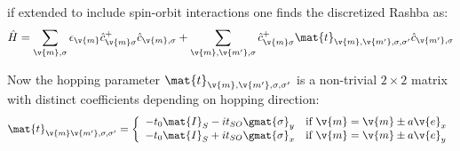 if extended to include spin-orbit interactions one finds the discretized Rashba \hamil as:
\begin{align}
	\hat{H} = \sum_{\v{m},\sigma} \epsilon_{\v{m}} \hat{c}^+_{\v{m}\sigma} \hat{c}_{\v{m},\sigma} +
	\sum_{\v{m},\v{m'},\sigma}  \hat{c}^+_{\v{m}\sigma} \mat{t}_{\v{m},\v{m'},\sigma,\sigma '} \hat{c}_{\v{m'},\sigma}
	\label{eqn:discretizedrashbahamil}
\end{align}

Now the hopping parameter $\mat{t}_{\v{m},\v{m'},\sigma,\sigma '}$ is a non-trivial $2 \times 2$ matrix with distinct coefficients depending on hopping direction:
\begin{align}
	\mat{t}_{\v{m}\v{m'},\sigma,\sigma '} = \left\{ \begin{array}[c]{cl} -t_0\mat{I}_S - i t_{SO} \gmat{\sigma}_y & \text{if } \v{m} = \v{m} \pm a \v{e}_{x} \\
		-t_0\mat{I}_S + i t_{SO} \gmat{\sigma}_x & \text{if } \v{m} = \v{m} \pm a \v{e}_{y} \end{array} \right.
	\label{eqn:tsohopping}
\end{align}
